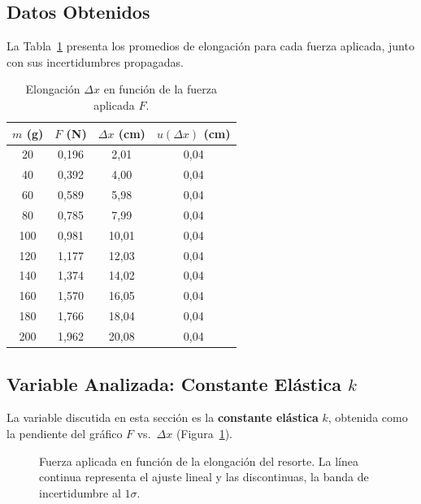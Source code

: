 \documentclass[conference,10pt]{IEEEtran}
\begin{document}
\subsection{Datos Obtenidos}
La Tabla~\ref{tab:datos} presenta los promedios de elongación para cada
fuerza aplicada, junto con sus incertidumbres propagadas.

\begin{table}[!t]
\centering
\caption{Elongación $\Delta x$ en función de la fuerza aplicada $F$.}
\label{tab:datos}
\begin{tabular}{cccc}
\toprule
\textbf{$m$ (g)} & \textbf{$F$ (N)} & \textbf{$\Delta x$ (cm)} & \textbf{$u(\Delta x)$ (cm)} \\
\midrule
 20 & 0,196 &  2,01 & 0,04 \\
 40 & 0,392 &  4,00 & 0,04 \\
 60 & 0,589 &  5,98 & 0,04 \\
 80 & 0,785 &  7,99 & 0,04 \\
100 & 0,981 & 10,01 & 0,04 \\
120 & 1,177 & 12,03 & 0,04 \\
140 & 1,374 & 14,02 & 0,04 \\
160 & 1,570 & 16,05 & 0,04 \\
180 & 1,766 & 18,04 & 0,04 \\
200 & 1,962 & 20,08 & 0,04 \\
\bottomrule
\end{tabular}
\end{table}

\subsection{Variable Analizada: Constante Elástica $k$}
La variable discutida en esta sección es la \textbf{constante elástica}
$k$, obtenida como la pendiente del gráfico $F$ vs.\ $\Delta x$
(Figura~\ref{fig:ajuste}).

\begin{figure}[!t]
\centering
{}
\caption{Fuerza aplicada en función de la elongación del resorte.
La línea continua representa el ajuste lineal y las discontinuas, la
banda de incertidumbre al $1\sigma$.}
\label{fig:ajuste}
\end{figure}
\end{document}
